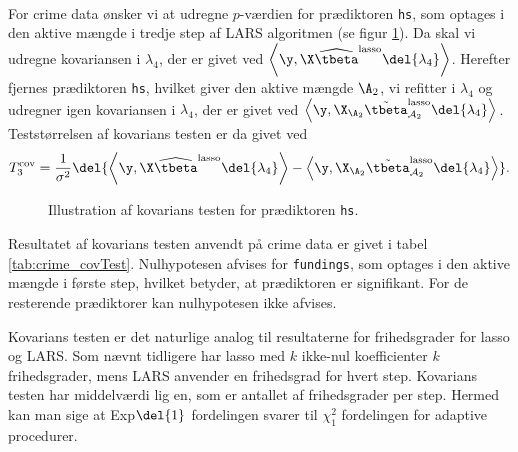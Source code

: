 \begin{eks} \\
For crime data ønsker vi at udregne \(p\)-værdien for prædiktoren \texttt{hs}, som optages i den aktive mængde i tredje step af LARS algoritmen (se figur \ref{fig:crime_covTest}). 
Da skal vi udregne kovariansen i \(\lambda_4\), der er givet ved \(\left\langle \y, \X \widehat{\tbeta}^\text{lasso} \del{\lambda_4} \right\rangle\).
Herefter fjernes prædiktoren \texttt{hs}, hvilket giver den aktive mængde \(\A_{2}\), vi refitter i \(\lambda_4\) og udregner igen kovariansen i \(\lambda_4\), der er givet ved \(\left\langle  \y, \X_{\A_{2}} \tilde{\tbeta}^\text{lasso}_{\mathcal{A}_{2}} \del{\lambda_{4}} \right\rangle\).
Teststørrelsen af kovarians testen er da givet ved
\begin{align*}
T_3^\text{cov} = \frac{1}{\sigma^2} \del{ \left\langle \y, \X \widehat{\tbeta}^\text{lasso} \del{\lambda_{4}} \right\rangle - \left\langle  \y, \X_{\A_{2}} \tilde{\tbeta}^\text{lasso}_{\mathcal{A}_{2}} \del{\lambda_{4}} \right\rangle}.
\end{align*}
%
\begin{figure}[H]
\centering
{}
\caption{Illustration af kovarians testen for prædiktoren \texttt{hs}.} \label{fig:crime_covTest}
\end{figure}
%
Resultatet af kovarians testen anvendt på crime data er givet i tabel \ref{tab:crime_covTest}.
Nulhypotesen afvises for \texttt{fundings}, som optages i den aktive mængde i første step, hvilket betyder, at prædiktoren er signifikant.
For de resterende prædiktorer kan nulhypotesen ikke afvises.
%

\end{eks}

Kovarians testen er det naturlige analog til resultaterne for frihedsgrader for lasso og LARS.
Som nævnt tidligere har lasso med \(k\) ikke-nul koefficienter \(k\) frihedsgrader, mens LARS anvender en frihedsgrad for hvert step.
Kovarians testen har middelværdi lig en, som er antallet af frihedsgrader per step.
Hermed kan man sige at Exp\(\del{1}\) fordelingen svarer til \(\chi_1^2\) fordelingen for adaptive procedurer.

